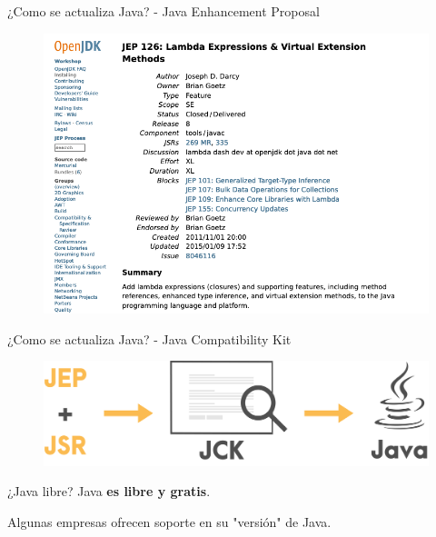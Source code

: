 \documentclass[aspectratio=169]{beamer}
\begin{document}
\begin{frame}[fragile]{¿Como se actualiza Java? - Java Enhancement Proposal}
	\begin{figure}
		\centering
		\includegraphics[width=0.9\linewidth]{Images/jep}
	\end{figure}
	
\end{frame}

\begin{frame}[fragile]{¿Como se actualiza Java? - Java Compatibility Kit}
	\begin{figure}
		\centering
		\includegraphics[width=0.9\linewidth]{Images/jck}
	\end{figure}
	
\end{frame}


\begin{frame}[fragile]{¿Java libre?}
Java \textbf{es libre y gratis}.

Algunas empresas ofrecen soporte en su "versión" de Java.
\end{frame}
\end{document}
